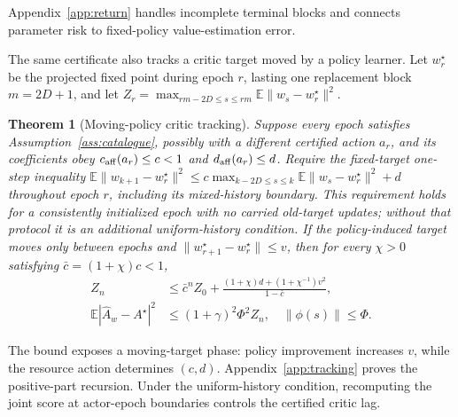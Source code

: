 \documentclass[journal]{IEEEtran}
\newtheorem{theorem}{Theorem}
\newcommand{\E}{\mathbb{E}}
\begin{document}
Appendix~\ref{app:return} handles incomplete terminal blocks and connects parameter risk to fixed-policy value-estimation error.

The same certificate also tracks a critic target moved by a policy learner.
Let $w_r^\star$ be the projected fixed point during epoch $r$, lasting one replacement block $m=2D+1$, and let $Z_r=\max_{rm-2D\le s\le rm}\E\|w_s-w_r^\star\|^2$.

\begin{theorem}[Moving-policy critic tracking]
Suppose every epoch satisfies Assumption~\ref{ass:catalogue}, possibly with a different certified action $a_r$, and its coefficients obey $c_{\rm aff}(a_r)\le c<1$ and $d_{\rm aff}(a_r)\le d$.
Require the fixed-target one-step inequality $\E\|w_{k+1}-w_r^\star\|^2\le c\max_{k-2D\le s\le k}\E\|w_s-w_r^\star\|^2+d$ throughout epoch $r$, including its mixed-history boundary.
This requirement holds for a consistently initialized epoch with no carried old-target updates; without that protocol it is an additional uniform-history condition.
If the policy-induced target moves only between epochs and
$\|w_{r+1}^\star-w_r^\star\|\le v$, then for every $\chi>0$ satisfying $\bar c=(1+\chi)c<1$,
\begin{align}
Z_n&\le \bar c^n Z_0+
\frac{(1+\chi)d+(1+\chi^{-1})v^2}{1-\bar c},\label{eq:tracking-bound}\\
\E|\widehat A_w-A^\star|^2
&\le (1+\gamma)^2\Phi^2 Z_n,\quad \|\phi(s)\|\le\Phi.
\label{eq:advantage-transfer}
\end{align}
\label{thm:tracking}
\end{theorem}

The bound exposes a moving-target phase: policy improvement increases $v$, while the resource action determines $(c,d)$.
Appendix~\ref{app:tracking} proves the positive-part recursion.
Under the uniform-history condition, recomputing the joint score at actor-epoch boundaries controls the certified critic lag.
\end{document}
